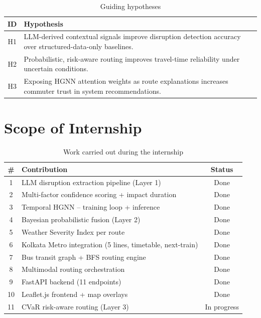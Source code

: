 \begin{table}[H]
\centering

\begin{tabular}{cp{11.5cm}}
\toprule
\textbf{ID} & \textbf{Hypothesis} \\
\midrule
H1 & LLM-derived contextual signals improve disruption detection accuracy
     over structured-data-only baselines. \\
H2 & Probabilistic, risk-aware routing improves travel-time reliability
     under uncertain conditions. \\
H3 & Exposing HGNN attention weights as route explanations increases
     commuter trust in system recommendations. \\
\bottomrule
\end{tabular}
\caption{Guiding hypotheses}
\end{table}

\section{Scope of Internship}

\begin{table}[H]
\centering
\caption{Work carried out during the internship}
\begin{tabular}{clc}
\toprule
\textbf{\#} & \textbf{Contribution} & \textbf{Status} \\
\midrule
1  & LLM disruption extraction pipeline (Layer 1)               & Done \\
2  & Multi-factor confidence scoring + impact duration           & Done \\
3  & Temporal HGNN -- training loop + inference                 & Done \\
4  & Bayesian probabilistic fusion (Layer 2)                     & Done \\
5  & Weather Severity Index per route                            & Done \\
6  & Kolkata Metro integration (5 lines, timetable, next-train)  & Done \\
7  & Bus transit graph + BFS routing engine                      & Done \\
8  & Multimodal routing orchestration                            & Done \\
9  & FastAPI backend (11 endpoints)                              & Done \\
10 & Leaflet.js frontend + map overlays                          & Done \\
11 & CVaR risk-aware routing (Layer 3)                           & In progress \\
\bottomrule
\end{tabular}
\end{table}

